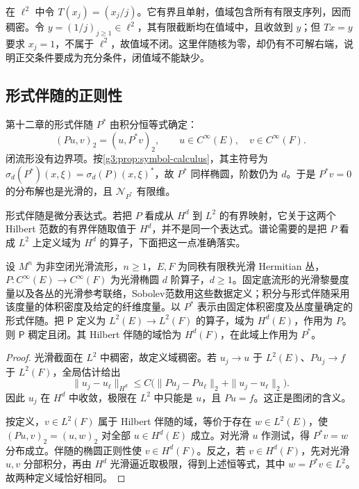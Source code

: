 \begin{example}\label{g3:exm:dense-nonclosed-range}
	在 \(\ell^2\) 中令 \(T(x_j)=(x_j/j)\)。它有界且单射，值域包含所有有限支序列，因而稠密。令 \(y=(1/j)_{j\ge1}\in\ell^2\)，其有限截断均在值域中，且收敛到 \(y\)；但 \(Tx=y\) 要求 \(x_j=1\)，不属于 \(\ell^2\)，故值域不闭。这里伴随核为零，却仍有不可解右端，说明正交条件要成为充分条件，闭值域不能缺少。
\end{example}

\subsection{形式伴随的正则性}
\label{g3:subsec:1302:02}
第十二章的形式伴随 \(P^*\) 由积分恒等式确定：
\[
	(Pu,v)_2=(u,P^*v)_2,\qquad u\in C^\infty(E),\quad v\in C^\infty(F).
\]
闭流形没有边界项。按\cref{g3:prop:symbol-calculus}，其主符号为 \(\sigma_d(P^*)(x,\xi)=\sigma_d(P)(x,\xi)^*\)，故 \(P^*\) 同样椭圆，阶数仍为 \(d\)。于是 \(P^*v=0\) 的分布解也是光滑的，且 \(\mathcal N_{P^*}\) 有限维。

\ProseParagraphBreak

形式伴随是微分表达式。若把 \(P\) 看成从 \(H^d\) 到 \(L^2\) 的有界映射，它关于这两个 Hilbert 范数的有界伴随取值于 \(H^d\)，并不是同一个表达式。谱论需要的是把 \(P\) 看成 \(L^2\) 上定义域为 \(H^d\) 的算子，下面把这一点准确落实。

\begin{proposition}\label{g3:prop:elliptic-adjoint-domain}
	设 \(M^n\) 为非空闭光滑流形，\(n\ge1\)，\(E,F\) 为同秩有限秩光滑 Hermitian 丛，\(P:C^\infty(E)\to C^\infty(F)\) 为光滑椭圆 \(d\) 阶算子，\(d\ge1\)。固定底流形的光滑黎曼度量以及各丛的光滑参考联络，Sobolev范数用这些数据定义；积分与形式伴随采用该度量的体积密度及给定的纤维度量。以 \(P^*\) 表示由固定体积密度及丛度量确定的形式伴随。把 \(\mathsf P\) 定义为 \(L^2(E)\to L^2(F)\) 的算子，域为 \(H^d(E)\)，作用为 \(P\)。则 \(\mathsf P\) 稠定且闭。其 Hilbert 伴随的域恰为 \(H^d(F)\)，在此域上作用为 \(P^*\)。
\end{proposition}
\begin{proof}
	光滑截面在 \(L^2\) 中稠密，故定义域稠密。若 \(u_j\to u\) 于 \(L^2(E)\)、\(Pu_j\to f\) 于 \(L^2(F)\)，全局估计给出
	\[
		\|u_j-u_\ell\|_{H^d}
		\le C\bigl(\|Pu_j-Pu_\ell\|_2+\|u_j-u_\ell\|_2\bigr).
	\]
	因此 \(u_j\) 在 \(H^d\) 中收敛，极限在 \(L^2\) 中只能是 \(u\)，且 \(Pu=f\)。这正是图闭的含义。

	按定义，\(v\in L^2(F)\) 属于 Hilbert 伴随的域，等价于存在 \(w\in L^2(E)\)，使
	\((Pu,v)_2=(u,w)_2\) 对全部 \(u\in H^d(E)\) 成立。对光滑 \(u\) 作测试，得 \(P^*v=w\) 分布成立。伴随的椭圆正则性使 \(v\in H^d(F)\)。反之，若 \(v\in H^d(F)\)，先对光滑 \(u,v\) 分部积分，再由 \(H^d\) 光滑逼近取极限，得到上述恒等式，其中 \(w=P^*v\in L^2\)。故两种定义域恰好相同。
\end{proof}

